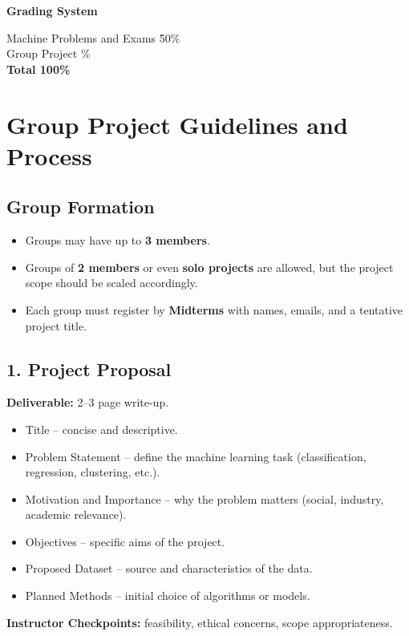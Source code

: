 \documentclass[a4paper,10pt]{article}
\begin{document}
\vspace{1em}


\noindent \textbf{Grading System}
\begin{tabbing}
Machine Problems and Exams \hspace{3em} \= 50\% \\
Group Project \% \\
\hspace{6em} \= \textbf{Total 100\%} \\
\end{tabbing}

\vspace{1.0em}


\section*{Group Project Guidelines and Process}

\subsection*{Group Formation}
\begin{itemize}
    \item Groups may have up to \textbf{3 members}.
    \item Groups of \textbf{2 members} or even \textbf{solo projects} are allowed, but the project scope should be scaled accordingly.
    \item Each group must register by \textbf{Midterms} with names, emails, and a tentative project title.
\end{itemize}

\subsection*{1. Project Proposal}
\textbf{Deliverable:} 2--3 page write-up.
\begin{itemize}
    \item Title -- concise and descriptive.
    \item Problem Statement -- define the machine learning task (classification, regression, clustering, etc.).
    \item Motivation and Importance -- why the problem matters (social, industry, academic relevance).
    \item Objectives -- specific aims of the project.
    \item Proposed Dataset -- source and characteristics of the data.
    \item Planned Methods -- initial choice of algorithms or models.
\end{itemize}
\textbf{Instructor Checkpoints:} feasibility, ethical concerns, scope appropriateness.
\end{document}
